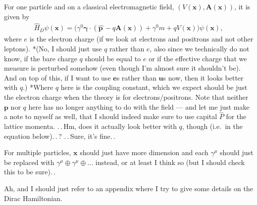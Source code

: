 \documentclass{report}
\begin{document}
For one particle and on a classical electromagnetic field, $(V(\boldsymbol{x}), \boldsymbol A(\boldsymbol{x}))$, it is given by
\begin{align}
\hat H_{D} \psi(\boldsymbol{x}) = 
	\big(
		\gamma^0 \boldsymbol \gamma \cdot (\hat{\boldsymbol p\,}\! - q \boldsymbol A(\boldsymbol{x})) +
		\gamma^0 m + q V(\boldsymbol{x})
	\big)\psi(\boldsymbol{x}),
\end{align}
where $e$ is the electron charge (if we look at electrons and positrons and not other leptons). *(No, I should just use $q$ rather than $e$, also since we technically do not know, if the bare charge $q$ should be equal to $e$ or if the effective charge that we measure is perturbed somehow (even though I'm almost sure it shouldn't be). And on top of this, if I want to use $\boldsymbol{e}$s rather than $\boldsymbol{u}$s now, then it looks better with $q$.) *Where $q$ here is the coupling constant, which we expect should be just the electron charge when the theory is for electrons/positrons. Note that neither $\boldsymbol{p}$ nor $q$ here has no longer anything to do with the field --- and let me just make a note to myself as well, that I should indeed make sure to use capital $\hat P$ for the lattice momenta. .\,.\,Hm, does it actually look better with $q$, though (i.e.\ in the equation below).\,.\,? .\,.\,Sure, it's fine.\,.

For multiple particles, $\boldsymbol{x}$ should just have more dimension and each $\gamma^\mu$ should just be replaced with $\gamma^\mu \oplus \gamma^\mu \oplus \ldots$ instead, or at least I think so (but I should check this to be sure).\,. 

Ah, and I should just refer to an appendix where I try to give some details on the Dirac Hamiltonian.
\end{document}
